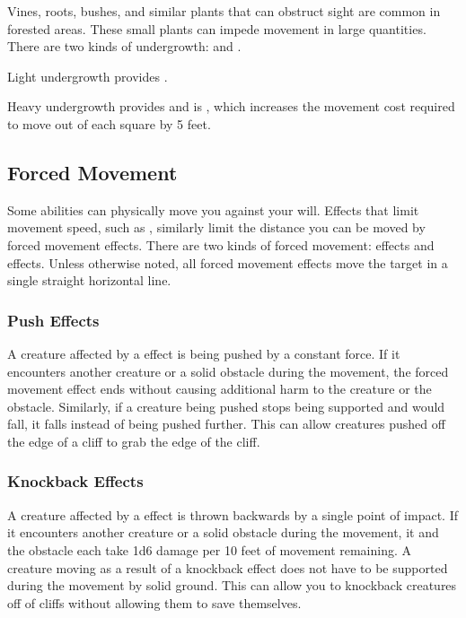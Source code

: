         \label{Undergrowth} Vines, roots, bushes, and similar plants that can obstruct sight are common in forested areas.
        These small plants can impede movement in large quantities.
        There are two kinds of undergrowth:  and .

        \label{Light Undergrowth}
        Light undergrowth provides .

        \label{Heavy Undergrowth}
        Heavy undergrowth provides  and is , which increases the movement cost required to move out of each square by 5 feet.

    \subsection{Forced Movement}\label{Forced Movement}
        Some abilities can physically move you against your will.
        Effects that limit movement speed, such as , similarly limit the distance you can be moved by forced movement effects.
        There are two kinds of forced movement:  effects and  effects.
        Unless otherwise noted, all forced movement effects move the target in a single straight horizontal line.

        \subsubsection{Push Effects}\label{Push Effects}
            A creature affected by a  effect is being pushed by a constant force.
            If it encounters another creature or a solid obstacle during the movement, the forced movement effect ends without causing additional harm to the creature or the obstacle.
            Similarly, if a creature being pushed stops being supported and would fall, it falls instead of being pushed further.
            This can allow creatures pushed off the edge of a cliff to grab the edge of the cliff.

        \subsubsection{Knockback Effects}\label{Knockback Effects}
            A creature affected by a  effect is thrown backwards by a single point of impact.
            If it encounters another creature or a solid obstacle during the movement, it and the obstacle each take 1d6 damage per 10 feet of movement remaining.
            A creature moving as a result of a knockback effect does not have to be supported during the movement by solid ground.
            This can allow you to knockback creatures off of cliffs without allowing them to save themselves.

